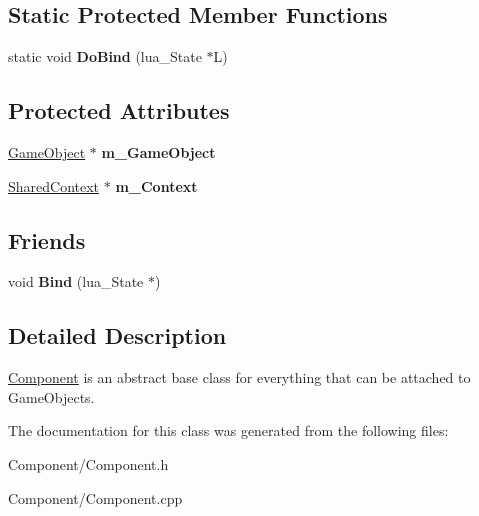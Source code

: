 \subsection*{Static Protected Member Functions}
\begin{DoxyCompactItemize}
\item 
\mbox{\label{classrvl_1_1_component_ac5f2d892c2e054a28270cbe20408425e}} 
static void {\bfseries Do\+Bind} (lua\+\_\+\+State $\ast$L)
\end{DoxyCompactItemize}
\subsection*{Protected Attributes}
\begin{DoxyCompactItemize}
\item 
\mbox{\label{classrvl_1_1_component_ae5a6eb7ac415cc05ff385c7998d37dce}} 
\hyperlink{classrvl_1_1_game_object}{Game\+Object} $\ast$ {\bfseries m\+\_\+\+Game\+Object}
\item 
\mbox{\label{classrvl_1_1_component_a100846515c5cf6608b8376c27b383967}} 
\hyperlink{structrvl_1_1_shared_context}{Shared\+Context} $\ast$ {\bfseries m\+\_\+\+Context}
\end{DoxyCompactItemize}
\subsection*{Friends}
\begin{DoxyCompactItemize}
\item 
\mbox{\label{classrvl_1_1_component_a2fe21ef42619f691f13abc7d5555490a}} 
void {\bfseries Bind} (lua\+\_\+\+State $\ast$)
\end{DoxyCompactItemize}


\subsection{Detailed Description}
\hyperlink{classrvl_1_1_component}{Component} is an abstract base class for everything that can be attached to Game\+Objects. 

The documentation for this class was generated from the following files\+:\begin{DoxyCompactItemize}
\item 
Component/Component.\+h\item 
Component/Component.\+cpp\end{DoxyCompactItemize}
